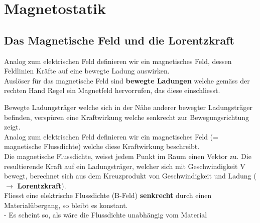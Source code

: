 
\newpage
\section{Magnetostatik}
\subsection{Das Magnetische Feld und die Lorentzkraft}

	Analog zum elektrischen Feld definieren wir ein magnetisches Feld, dessen Feldlinien Kräfte auf eine bewegte Ladung auswirken. \\
	Auslöser für das magnetische Feld sind \textbf{bewegte Ladungen} welche gemäss der rechten Hand Regel ein Magnetfeld hervorrufen, das diese einschliesst. \\
\begin{center}


	\end{center}
	\beginip
	Bewegte Ladungsträger welche sich in der Nähe anderer bewegter Ladungsträger befinden, verspüren eine Kraftwirkung welche senkrecht zur Bewegungsrichtung zeigt. \\
	Analog zum elektrischen Feld definieren wir ein magnetisches Feld (= magnetische Flussdichte) welche diese Kraftwirkung beschreibt. \\
	Die magnetische Flussdichte, weisst jedem Punkt im Raum einen Vektor zu. Die resultierende Kraft auf ein Ladungsträger, welcher sich mit Geschwindigkeit V bewegt,
	berechnet sich aus dem Kreuzprodukt von Geschwindigkeit und Ladung ($\rightarrow$ \textbf{Lorentzkraft}). \\
	Fliesst eine elektrische Flussdichte (B-Feld) \textbf{senkrecht} durch einen Materialübergang, so bleibt es konstant. \\
	- Es scheint so, als wäre die Flussdichte unabhängig vom Material
	\iend




